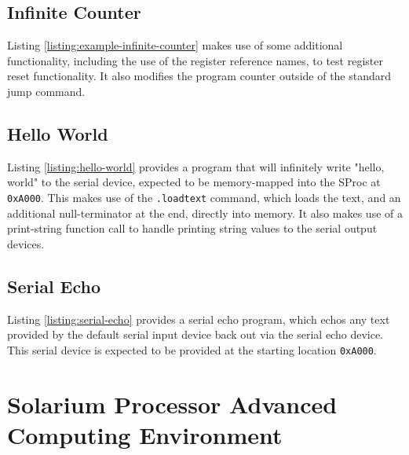 \documentclass{article}
\begin{document}


\subsection{Infinite Counter}

Listing \ref{listing:example-infinite-counter} makes use of some additional functionality, including the use of the register reference names, to test register reset functionality. It also modifies the program counter outside of the standard jump command.



\subsection{Hello World}

Listing  \ref{listing:hello-world} provides a program that will infinitely write "hello, world" to the serial device, expected to be memory-mapped into the SProc at \texttt{0xA000}. This makes use of the \texttt{.loadtext} command, which loads the text, and an additional null-terminator at the end, directly into memory. It also makes use of a print-string function call to handle printing string values to the serial output devices.



\pagebreak

\subsection{Serial Echo}

Listing \ref{listing:serial-echo} provides a serial echo program, which echos any text provided by the default serial input device back out via the serial echo device. This serial device is expected to be provided at the starting location \texttt{0xA000}.



\pagebreak

\section{Solarium Processor Advanced Computing Environment}
\end{document}
